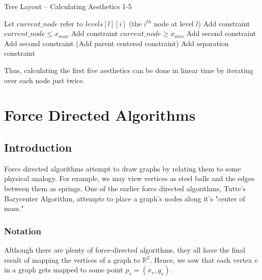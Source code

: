 \documentclass[11pt]{report}
\begin{document}
\begin{algorithm}[H]
    \caption{Tree Layout -- Calculating Aesthetics 1-5}
    \begin{algorithmic}[1]
             
            \State Let $current\_node$ refer to $levels[l][i]$ (the $i^{th}$ node at level $l$)
            \State Add constraint $current\_node \leq x_{max}$ 
            \State Add constraint $current\_node \geq x_{min}$
                \State Add second constraint
            \EndIf
                \State Add second constraint
            \EndIf
                \State (Add parent centered constraint)
            \EndIf
                \State Add separation constraint
            \EndIf
            \EndFor
        \EndFor
        \EndProcedure
    \end{algorithmic}
\end{algorithm}

Thus, calculating the first five aesthetics can be done in linear time by iterating over each node just twice.

\pagebreak

\chapter{Force Directed Algorithms}
\section{Introduction}
Force directed algorithms attempt to draw graphs by relating them to some physical analogy. For example, we may view vertices as steel balls and the edges between them as springs. One of the earlier force directed algorithms, Tutte's Barycenter Algorithm, attempts to place a graph's nodes along it's "center of mass."

\subsection{Notation}
Although there are plenty of force-directed algorithms, they all have the final result of mapping the vertices of a graph to $\mathbb{R}^2$. Hence, we saw that each vertex $v$ in a graph gets mapped to some point $p_v = (x_v, y_v)$. 
\end{document}

